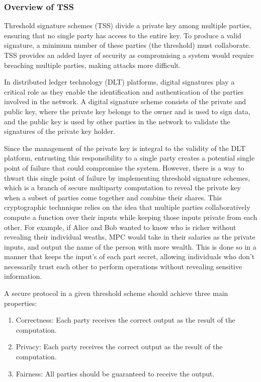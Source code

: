 \documentclass[12pt]{article}
\begin{document}
\subsubsection{Overview of TSS}
Threshold signature schemes (TSS) divide a private key among multiple parties, ensuring that no single party has access to the entire key. To produce a valid signature, a minimum number of these parties (the threshold) must collaborate. TSS provides an added layer of security as compromising a system would require breaching multiple parties, making attacks more difficult.

In distributed ledger technology (DLT) platforms, digital signatures play a critical role as they enable the identification and authentication of the parties involved in the network. A digital signature scheme consists of the private and public key, where the private key belongs to the owner and is used to sign data, and the public key is used by other parties in the network to validate the signatures of the private key holder. 

Since the management of the private key is integral to the validity of the DLT platform, entrusting this responsibility to a single party creates a potential single point of failure that could compromise the system. However, there is a way to thwart this single point of failure by implementing threshold signature schemes, which is a branch of secure multiparty computation to reveal the private key when a subset of parties come together and combine their shares. This cryptographic technnique relies on the idea that multiple parties collaboratively compute a function over their inputs while keeping those inputs private from each other. For example, if Alice and Bob wanted to know who is richer without revealing their individual weaths, MPC would take in their salaries as the private inputs, and output the name of the person with more wealth. This is done so in a manner that keeps the input's of each part secret, allowing individuals who don't necessarily trust each other to perform operations without revealing sensitive information.

A secure protocol in a given threshold scheme should achieve three main properties:
\begin{enumerate}
    \item Correctness: Each party receives the correct output as the result of the computation.
    \item Privacy: Each party receives the correct output as the result of the computation.
    \item Fairness: All parties should be guaranteed to receive the output.
\end{enumerate}
\end{document}
